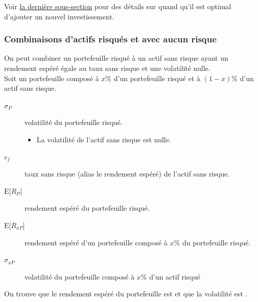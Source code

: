 \documentclass[10pt, french]{article}
\begin{document}
\begin{multicols*}{2}
\begin{center}
\end{center}

Voir \hyperref[sec:MVT-newinv]{la dernière sous-section} pour des détails sur quand qu'il est optimal d'ajouter un nouvel investissement.


\columnbreak
\subsubsection{Combinaisons d'actifs risqués et avec aucun risque}
On peut combiner un portefeuille risqué à un actif sans risque ayant un rendement espéré égale au taux sans risque et une volatilité nulle.\\

Soit un portefeuille composé à $x\%$ d'un portefeuille risqué et à $(1 - x)\%$ d'un actif sans risque.
\begin{distributions}[Notation]
\begin{description}
	\item[$\sigma_{P}$]	volatilité du portefeuille risqué.
		\begin{itemize}
		\item	La volatilité de l'actif sans risque est nulle.
		\end{itemize}
	\item[$r_{f}$]	taux sans risque (alias le rendement espéré) de l'actif sans risque.
	\item[$\text{E}\lbrack R_{P}\rbrack$]	rendement espéré du portefeuille risqué.
	\item[$\text{E}\lbrack R_{xP}\rbrack$]	rendement espéré d'un portefeuille composé à $x\%$ du portefeuille risqué.
	\item[$\sigma_{xP}$]	volatilité du portefeuille composé à $x\%$ d'un actif risqué
\end{description}
\end{distributions}

On trouve que le rendement espéré du portefeuille est  et que la volatilité est . 


\end{multicols*}
\end{document}
